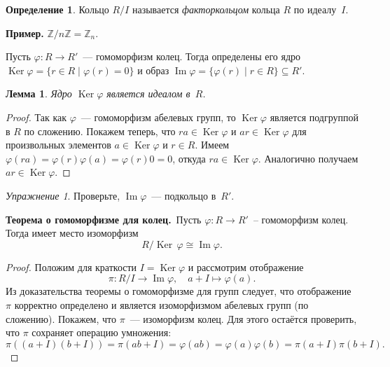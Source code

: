 \documentclass[a4paper,10pt]{amsart}
\newcommand{\Ker}{\mathop{\mathrm{Ker}}}
\renewcommand{\Im}{\mathop{\mathrm{Im}}}
\def\ZZ{{\mathbb Z}}%
\newtheorem{lemma}{Лемма}
\theoremstyle{definition}
\newtheorem{definition}{Определение}
\theoremstyle{remark}
\newtheorem{exercise}{Упражнение}
\begin{document}
\begin{definition}
Кольцо $R/I$ называется {\it факторкольцом} кольца $R$ по
идеалу~$I$.
\end{definition}

\textbf{Пример.} $\ZZ / n \ZZ = \ZZ_n$.

Пусть $\varphi\colon R\to R'$~--- гомоморфизм колец. Тогда
определены его ядро $\Ker \varphi = \lbrace r \in R \mid \varphi(r)
= 0 \rbrace$ и образ $\Im \varphi = \lbrace \varphi(r) \mid r \in R
\rbrace \subseteq R'$.

\begin{lemma}
Ядро $\Ker \varphi$ является идеалом в~$R$.
\end{lemma}

\begin{proof}
Так как $\varphi$~--- гомоморфизм абелевых групп, то $\Ker \varphi$
является подгруппой в $R$ по сложению. Покажем теперь, что $ra \in
\Ker \varphi$ и $ar \in \Ker \varphi$ для произвольных элементов $a
\in \Ker \varphi$ и $r \in R$. Имеем $\varphi(ra) = \varphi(r)
\varphi(a) = \varphi(r) 0 = 0$, откуда $ra \in \Ker \varphi$.
Аналогично получаем $ar \in \Ker \varphi$.
\end{proof}

\begin{exercise}
Проверьте, $\Im \varphi$~--- подкольцо в~$R'$.
\end{exercise}

\smallskip

{\bf Теорема о гомоморфизме для колец.}\ Пусть $\varphi\colon R\to
R'$~-- гомоморфизм колец. Тогда имеет место изоморфизм
$$
R/\Ker\,\varphi\cong\Im\varphi.
$$

\smallskip

\begin{proof}
Положим для краткости $I = \Ker \varphi$ и рассмотрим отображение
$$
\pi \colon R/I \to \Im \varphi, \quad a+I \mapsto \varphi(a).
$$
Из доказательства теоремы о гомоморфизме для групп следует, что
отображение $\pi$ корректно определено и является изоморфизмом
абелевых групп (по сложению). Покажем, что $\pi$~--- изоморфизм
колец. Для этого остаётся проверить, что $\pi$ сохраняет операцию
умножения:
$$
\pi((a+I)(b+I)) = \pi(ab+I) = \varphi(ab) = \varphi(a) \varphi(b) =
\pi(a+I) \pi(b+I).
$$
\end{proof}
\end{document}
